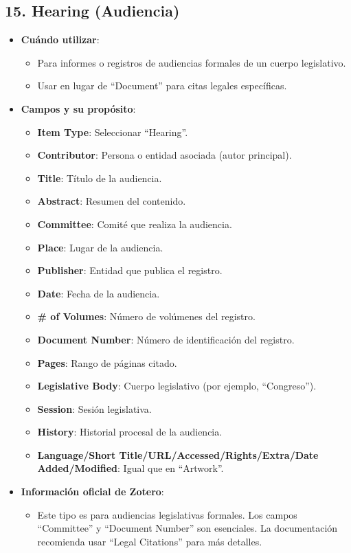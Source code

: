 \documentclass[
  jou,
  floatsintext,
  longtable,
  a4paper,
  nolmodern,
  notxfonts,
  notimes,
  colorlinks=true,linkcolor=blue,citecolor=blue,urlcolor=blue]{apa7}
\providecommand{\tightlist}{%
  \setlength{\itemsep}{0pt}\setlength{\parskip}{0pt}}
\begin{document}
\subsection{15. Hearing (Audiencia)}\label{hearing-audiencia}

\begin{itemize}
\tightlist
\item
  \textbf{Cuándo utilizar}:

  \begin{itemize}
  \tightlist
  \item
    Para informes o registros de audiencias formales de un cuerpo
    legislativo.
  \item
    Usar en lugar de ``Document'' para citas legales específicas.
  \end{itemize}
\item
  \textbf{Campos y su propósito}:

  \begin{itemize}
  \tightlist
  \item
    \textbf{Item Type}: Seleccionar ``Hearing''.
  \item
    \textbf{Contributor}: Persona o entidad asociada (autor principal).
  \item
    \textbf{Title}: Título de la audiencia.
  \item
    \textbf{Abstract}: Resumen del contenido.
  \item
    \textbf{Committee}: Comité que realiza la audiencia.
  \item
    \textbf{Place}: Lugar de la audiencia.
  \item
    \textbf{Publisher}: Entidad que publica el registro.
  \item
    \textbf{Date}: Fecha de la audiencia.
  \item
    \textbf{\# of Volumes}: Número de volúmenes del registro.
  \item
    \textbf{Document Number}: Número de identificación del registro.
  \item
    \textbf{Pages}: Rango de páginas citado.
  \item
    \textbf{Legislative Body}: Cuerpo legislativo (por ejemplo,
    ``Congreso'').
  \item
    \textbf{Session}: Sesión legislativa.
  \item
    \textbf{History}: Historial procesal de la audiencia.
  \item
    \textbf{Language/Short Title/URL/Accessed/Rights/Extra/Date
    Added/Modified}: Igual que en ``Artwork''.
  \end{itemize}
\item
  \textbf{Información oficial de Zotero}:

  \begin{itemize}
  \tightlist
  \item
    Este tipo es para audiencias legislativas formales. Los campos
    ``Committee'' y ``Document Number'' son esenciales. La documentación
    recomienda usar ``Legal Citations'' para más detalles.
  \end{itemize}
\end{itemize}
\end{document}
